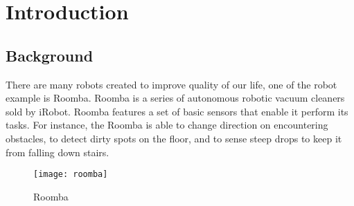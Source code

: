\section{Introduction}
\label{sec:introduction}
\subsection{Background}
	There are many robots created to improve quality of our life, one of the robot example is Roomba. Roomba is a series of autonomous robotic vacuum cleaners sold by iRobot. Roomba features a set of basic sensors that enable it perform its tasks. For instance, the Roomba is able to change direction on encountering obstacles, to detect dirty spots on the floor, and to sense steep drops to keep it from falling down stairs. \cite{wiki:Roomba} 
	\begin{figure}[ht]
	\centering
	\texttt{[image: roomba]}
	\caption{Roomba}
	\end{figure}
	\par
	

